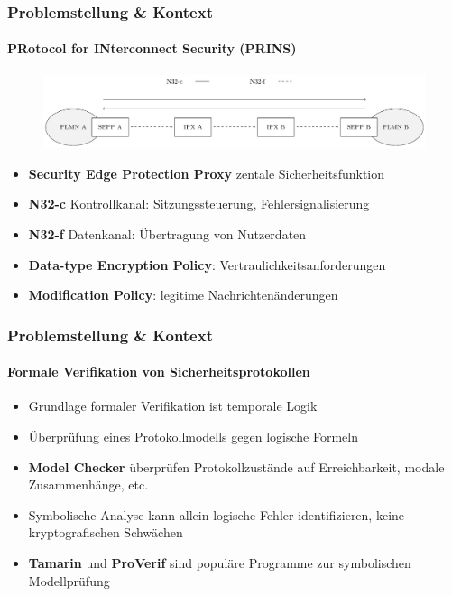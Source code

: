 \documentclass{beamer}
\begin{document}
\begin{frame}
    \frametitle{Problemstellung \& Kontext}
    \framesubtitle{PRotocol for INterconnect Security (PRINS)}

    \begin{figure}
    \centering
    \includegraphics[width=\linewidth]{n32-interface-short.pdf}
    \end{figure}

    \begin{itemize}
        \item<2-> \textbf{Security Edge Protection Proxy} zentale Sicherheitsfunktion
        \item<3-> \textbf{N32-c} Kontrollkanal: Sitzungssteuerung, Fehlersignalisierung
        \item<3-> \textbf{N32-f} Datenkanal: Übertragung von Nutzerdaten
        \item<4-> \textbf{Data-type Encryption Policy}: Vertraulichkeitsanforderungen
        \item<4-> \textbf{Modification Policy}: legitime Nachrichtenänderungen
    \end{itemize}
\end{frame}

\begin{frame}
    \frametitle{Problemstellung \& Kontext}
    \framesubtitle{Formale Verifikation von Sicherheitsprotokollen}

    \begin{itemize}
        \item<1-> Grundlage formaler Verifikation ist temporale Logik
        \vspace*{2mm}
        \item<2-> Überprüfung eines Protokollmodells gegen logische Formeln
        \vspace*{2mm}
        \item<3-> \textbf{Model Checker} überprüfen Protokollzustände auf Erreichbarkeit, modale Zusammenhänge, etc.
        \vspace*{2mm}
        \item<4-> Symbolische Analyse kann allein logische Fehler identifizieren, keine kryptografischen Schwächen
        \vspace*{2mm}
        \item<5-> \textbf{Tamarin} und \textbf{ProVerif} sind populäre Programme zur symbolischen Modellprüfung
    \end{itemize}
\end{frame}
\end{document}
